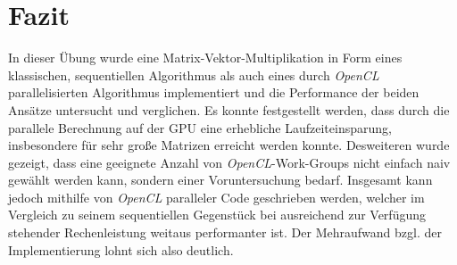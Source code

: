 \documentclass[
	ngerman,
	ruledheaders=section,
	class=report,
	thesis={type=Dokumentation},
	ignore-missing-data=true,
	accentcolor=9c,
	custommargins=false,
	marginpar=false,
	parskip=half-,
	fontsize=11pt,
]{tudapub}
\begin{document}
\chapter{Fazit}

In dieser Übung wurde eine Matrix-Vektor-Multiplikation in Form eines klassischen, sequentiellen Algorithmus als auch eines durch \textit{OpenCL} parallelisierten Algorithmus implementiert und die Performance der beiden Ansätze untersucht und verglichen. Es konnte festgestellt werden, dass durch die parallele Berechnung auf der GPU eine erhebliche Laufzeiteinsparung, insbesondere für sehr große Matrizen erreicht werden konnte. Desweiteren wurde gezeigt, dass eine geeignete Anzahl von \textit{OpenCL}-Work-Groups nicht einfach naiv gewählt werden kann, sondern einer Voruntersuchung bedarf. Insgesamt kann jedoch mithilfe von \textit{OpenCL} paralleler Code geschrieben werden, welcher im Vergleich zu seinem sequentiellen Gegenstück bei ausreichend zur Verfügung stehender Rechenleistung weitaus performanter ist. Der Mehraufwand bzgl. der Implementierung lohnt sich also deutlich.
\end{document}
